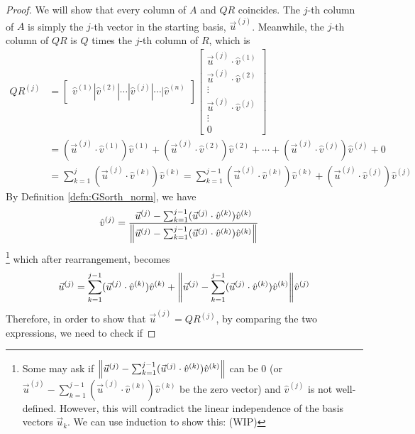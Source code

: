 \begin{proof}
We will show that every column of $A$ and $QR$ coincides. The $j$-th column of $A$ is simply the $j$-th vector in the starting basis, $\vec{u}^{(j)}$. Meanwhile, the $j$-th column of $QR$ is $Q$ times the $j$-th column of $R$, which is
\begin{align*}
QR^{(j)} &=
\begin{bmatrix}
\hat{v}^{(1)}|\hat{v}^{(2)}|\cdots|\hat{v}^{(j)}|\cdots|\hat{v}^{(n)}   
\end{bmatrix}
\begin{bmatrix}
\vec{u}^{(j)} \cdot \hat{v}^{(1)} \\   
\vec{u}^{(j)} \cdot \hat{v}^{(2)} \\   
\vdots \\
\vec{u}^{(j)} \cdot \hat{v}^{(j)} \\
\vdots \\
0
\end{bmatrix} \\
&= (\vec{u}^{(j)} \cdot \hat{v}^{(1)}) \hat{v}^{(1)} + (\vec{u}^{(j)} \cdot \hat{v}^{(2)}) \hat{v}^{(2)} + \cdots + (\vec{u}^{(j)} \cdot \hat{v}^{(j)}) \hat{v}^{(j)} + 0 \\
&= \sum_{k=1}^{j}(\vec{u}^{(j)} \cdot \hat{v}^{(k)})\hat{v}^{(k)} = \sum_{k=1}^{j-1}(\vec{u}^{(j)} \cdot \hat{v}^{(k)})\hat{v}^{(k)} + (\vec{u}^{(j)} \cdot \hat{v}^{(j)})\hat{v}^{(j)}
\end{align*}
By Definition \ref{defn:GSorth_norm}, we have
\begin{align*}
\hat{v}^{(j)} &= \frac{\vec{u}^{(j)} - \sum_{k=1}^{j-1}(\vec{u}^{(j)} \cdot \hat{v}^{(k)})\hat{v}^{(k)}}{\norm{\vec{u}^{(j)} - \sum_{k=1}^{j-1}(\vec{u}^{(j)} \cdot \hat{v}^{(k)})\hat{v}^{(k)}}}
\end{align*}
\footnote{\label{foot:GSnonzero} Some may ask if $\norm{\vec{u}^{(j)} - \sum_{k=1}^{j-1}(\vec{u}^{(j)} \cdot \hat{v}^{(k)})\hat{v}^{(k)}}$ can be $0$ (or $\vec{u}^{(j)} - \sum_{k=1}^{j-1}(\vec{u}^{(j)} \cdot \hat{v}^{(k)})\hat{v}^{(k)}$ be the zero vector) and $\hat{v}^{(j)}$ is not well-defined. However, this will contradict the linear independence of the basis vectors $\vec{u}_k$. We can use induction to show this: (WIP)} which after rearrangement, becomes
\begin{align*}
\vec{u}^{(j)} = \sum_{k=1}^{j-1}(\vec{u}^{(j)} \cdot \hat{v}^{(k)})\hat{v}^{(k)} + {\norm{\vec{u}^{(j)} - \sum_{k=1}^{j-1}(\vec{u}^{(j)} \cdot \hat{v}^{(k)})\hat{v}^{(k)}}}\hat{v}^{(j)}
\end{align*}
Therefore, in order to show that $\vec{u}^{(j)} = QR^{(j)}$, by comparing the two expressions, we need to check if

\end{proof}
